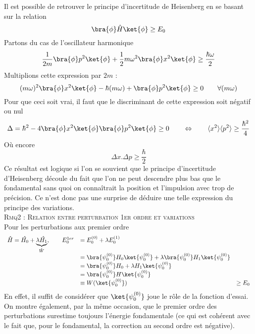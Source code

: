 		Il est possible de retrouver le principe d'incertitude de Heisenberg en se basant sur la relation
		\begin{equation}
		\bra{\phi}\hat{H}\ket{\phi} \geq E_0
		\end{equation}		
		Partons du cas de l'oscillateur harmonique
		\begin{equation}
		\frac{1}{2m}\bra{\phi}p^2\ket{\phi} + \frac{1}{2}m\omega^2\bra{\phi}x^2\ket{\phi} \geq 
		\frac{\hbar\omega}{2}
		\end{equation}
		Multiplions cette expression par $2m$ :
		\begin{equation}
		(m\omega)^2\bra{\phi}x^2\ket{\phi} - \hbar(m\omega) + \bra{\phi}p^2\ket{\phi} \geq 0\qquad 
		\forall (m\omega)
		\end{equation}
		Pour que ceci soit vrai, il faut que le discriminant de cette expression soit négatif ou 
		nul 
		\begin{equation}
		\Delta = \hbar^2-4\bra{\phi}x^2\ket{\phi}\bra{\phi}p^2\ket{\phi}\geq 0\qquad\Leftrightarrow
		\qquad \langle x^2\rangle\langle p^2\rangle \geq \frac{\hbar^2}{4}
		\end{equation}
		Où encore
		\begin{equation}
		\Delta x.\Delta p \geq \dfrac{\hbar}{2}
		\end{equation}
		Ce résultat est logique si l'on se souvient que le principe d'incertitude d'Heisenberg 
		découle du fait que l'on ne peut descendre plus bas que le fondamental sans quoi on 
		connaîtrait la position et l'impulsion avec trop de précision. Ce n'est donc pas une 
		surprise de déduire une telle expression du principe des variations.\\
				
		
		\textsc{Rmq2 : Relation entre perturbation 1er ordre et variations}\\
		Pour les perturbations aux premier ordre
		\begin{equation}
		\begin{array}{lll}
		\hat H = \hat{H_0} + \underbrace{\lambda\hat{H_1}}_{\hat{W}},\qquad E_0^{1er} &= E_0^{(0)}+
		\lambda E_0^{(1)}\\
		&= \bra{\psi_0^{(0)}}H_0\ket{\psi_0^{(0)}} + \lambda\bra{\psi_0^{(0)}}H_1\ket{\psi_0^{(0)}}\\
		&= \bra{\psi_0^{(0)}}H_0+\lambda H_1\ket{\psi_0^{(0)}}\\
		&= \bra{\psi_0^{(0)}}H\ket{\psi_0^{(0)}} \\
		&\equiv W(\ket{\psi_0^{(0)}}) &\geq E_0
		\end{array}
		\end{equation}
		En effet, il suffit de considérer que $\ket{\psi_0^{(0)}}$ joue le rôle de la fonction 
		d'essai. On montre également, par la même occasion, que le premier ordre des perturbations 
		surestime toujours l'énergie fondamentale (ce qui est cohérent avec le fait que, pour le 
		fondamental, la correction au second ordre est négative).
		
